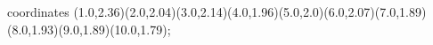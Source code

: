 					coordinates { (1.0,2.36)(2.0,2.04)(3.0,2.14)(4.0,1.96)(5.0,2.0)(6.0,2.07)(7.0,1.89)(8.0,1.93)(9.0,1.89)(10.0,1.79)};